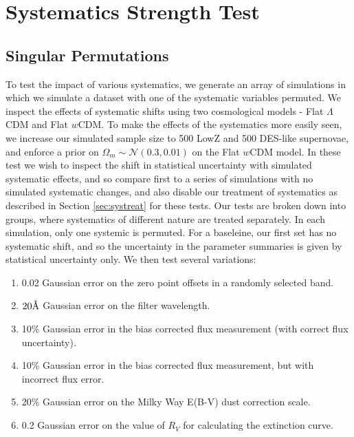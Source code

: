 \documentclass[a4paper,fleqn,usenatbib]{mnras}
\newcommand{\angstrom}{\mbox{\normalfont\AA}}
\begin{document}
\section{Systematics Strength Test}
\label{sec:sys}

\subsection{Singular Permutations}

To test the impact of various systematics, we generate an array of simulations in which we simulate a dataset with one of the systematic variables permuted. We inspect the effects of systematic shifts using two cosmological models - Flat $\Lambda$CDM and Flat $w$CDM. To make the effects of the systematics more easily seen, we increase our simulated sample size to 500 LowZ and 500 DES-like supernovae, and enforce a prior on $\Omega_m \sim \mathcal{N}(0.3, 0.01)$ on the Flat $w$CDM model. In these test we wish to inspect the shift in statistical uncertainty with simulated systematic effects, and so compare first to a series of simulations with no simulated systematic changes, and also disable our treatment of systematics as described in Section \ref{sec:systreat} for these tests. Our tests are broken down into groups, where systematics of different nature are treated separately. In each simulation, only one systemic is permuted. For a baseleine, our first set has no systematic shift, and so the uncertainty in the parameter summaries is given by statistical uncertainty only. We then test several variations:
\begin{enumerate}
	\item 0.02 Gaussian error on the zero point offsets in a randomly selected band.
	\item $20 \angstrom $ Gaussian error on the filter wavelength.
	\item 10\% Gaussian error in the bias corrected flux measurement (with correct flux uncertainty).
	\item 10\% Gaussian error in the bias corrected flux measurement, but with incorrect flux error.
	\item 20\% Gaussian error on the Milky Way E(B-V) dust correction scale.
	\item 0.2 Gaussian error on the value of $R_V$ for calculating the extinction curve.
\end{enumerate}
\end{document}
